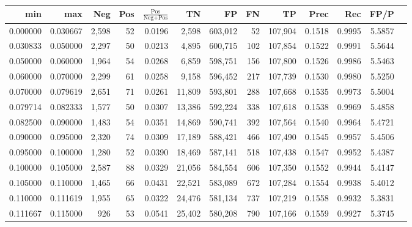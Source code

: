 \begin{tabular}{rrrrrrrrrrrrr}
\toprule
     min &      max &   Neg & Pos & $\frac{\text{Pos}}{\text{Neg}+\text{Pos}}$ &      TN &      FP &      FN &      TP &   Prec &    Rec &   FP/P \\
\midrule
0.000000 & 0.030667 & 2,598 &  52 &                                     0.0196 &   2,598 & 603,012 &      52 & 107,904 & 0.1518 & 0.9995 & 5.5857 \\
0.030833 & 0.050000 & 2,297 &  50 &                                     0.0213 &   4,895 & 600,715 &     102 & 107,854 & 0.1522 & 0.9991 & 5.5644 \\
0.050000 & 0.060000 & 1,964 &  54 &                                     0.0268 &   6,859 & 598,751 &     156 & 107,800 & 0.1526 & 0.9986 & 5.5463 \\
0.060000 & 0.070000 & 2,299 &  61 &                                     0.0258 &   9,158 & 596,452 &     217 & 107,739 & 0.1530 & 0.9980 & 5.5250 \\
0.070000 & 0.079619 & 2,651 &  71 &                                     0.0261 &  11,809 & 593,801 &     288 & 107,668 & 0.1535 & 0.9973 & 5.5004 \\
0.079714 & 0.082333 & 1,577 &  50 &                                     0.0307 &  13,386 & 592,224 &     338 & 107,618 & 0.1538 & 0.9969 & 5.4858 \\
0.082500 & 0.090000 & 1,483 &  54 &                                     0.0351 &  14,869 & 590,741 &     392 & 107,564 & 0.1540 & 0.9964 & 5.4721 \\
0.090000 & 0.095000 & 2,320 &  74 &                                     0.0309 &  17,189 & 588,421 &     466 & 107,490 & 0.1545 & 0.9957 & 5.4506 \\
0.095000 & 0.100000 & 1,280 &  52 &                                     0.0390 &  18,469 & 587,141 &     518 & 107,438 & 0.1547 & 0.9952 & 5.4387 \\
0.100000 & 0.105000 & 2,587 &  88 &                                     0.0329 &  21,056 & 584,554 &     606 & 107,350 & 0.1552 & 0.9944 & 5.4147 \\
0.105000 & 0.110000 & 1,465 &  66 &                                     0.0431 &  22,521 & 583,089 &     672 & 107,284 & 0.1554 & 0.9938 & 5.4012 \\
0.110000 & 0.111619 & 1,955 &  65 &                                     0.0322 &  24,476 & 581,134 &     737 & 107,219 & 0.1558 & 0.9932 & 5.3831 \\
0.111667 & 0.115000 &   926 &  53 &                                     0.0541 &  25,402 & 580,208 &     790 & 107,166 & 0.1559 & 0.9927 & 5.3745 \\

\end{tabular}
